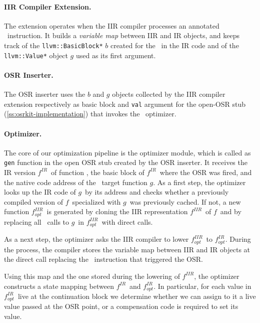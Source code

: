 \paragraph*{IIR Compiler Extension.} The extension operates when the IIR compiler processes an annotated \feval\ instruction. It builds a {\em variable map} between IIR and IR objects, and keeps track of the {\tt llvm::BasicBlock*} $b$ created for the \feval\ in the IR code and of the {\tt llvm::Value*} object $g$ used as its first argument. 

\paragraph*{OSR Inserter.} The OSR inserter uses the $b$ and $g$ objects collected by the IIR compiler extension respectively as basic block and {\tt val} argument for the open-OSR stub (\mysection\ref{ss:osrkit-implementation}) that invokes the \feval\ optimizer.

\newcommand{\fBase}{$f$}
\newcommand{\fOpt}{$f_{opt}$}
\newcommand{\fIIR}{$f^{IIR}$}
\newcommand{\fIR}{$f^{IR}$}
\newcommand{\fOptIIR}{$f^{IIR}_{opt}$}
\newcommand{\fOptIR}{$f^{IR}_{opt}$}
\newcommand{\gTarget}{$g$}

\paragraph*{Optimizer.} The core of our optimization pipeline is the optimizer module, which is called as {\tt gen} function in the open OSR stub created by the OSR inserter. It receives the IR version \fIR\ of function \fbase, the basic block of \fIR\ where the OSR was fired, and the native code address of the \feval\ target function \gTarget. As a first step, the optimizer looks up the IR code of \gTarget\ by its address and checks whether a previously compiled version of \fBase\ specialized with \gTarget\ was previously cached. If not, a new function \fOptIIR\ is generated by cloning the IIR representation \fIIR\ of \fBase\ and by replacing all \feval\ calls to \gTarget\ in \fOptIIR\ with direct calls.

As a next step, the optimizer asks the IIR compiler to lower \fOptIIR\ to \fOptIR. During the process, the compiler stores the variable map between IIR and IR objects at the direct call replacing the \feval\ instruction that triggered the OSR.

Using this map and the one stored during the lowering of \fIIR, the optimizer constructs a state mapping between \fIR\ and \fOptIR. In particular, for each value in \fOptIR\ live at the continuation block we determine whether we can assign to it a live value passed at the OSR point, or a compensation code is required to set its value.

